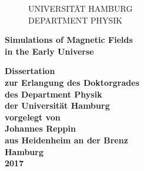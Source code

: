 \begin{center}

    \begin{figure}[h]
	    UNIVERSITÄT HAMBURG\\
	    DEPARTMENT PHYSIK
	    \vspace{1cm}
    \end{figure}

    \vspace{4.0cm}
    \Large{\textbf{Simulations of Magnetic Fields \\in the Early Universe}} \vspace{0.5cm}

    \Large{\textbf{Dissertation}}\\\vspace{0.5cm}
    \Large{\textbf{zur Erlangung des Doktorgrades}} \\\vspace{0.5cm}
    \Large{\textbf{des Department Physik}} \\\vspace{0.5cm}
    \Large{\textbf{der Universität Hamburg}} \\\vspace{0.5cm}
    \large {\textbf{vorgelegt von \\\vspace{0.5cm}
      Johannes Reppin \\\vspace{0.5cm}
      aus Heidenheim an der Brenz}}\\\vspace{0.5cm}
     \Large{\textbf{Hamburg \\\vspace{0.5cm}
     2017}}
     
\end{center}
